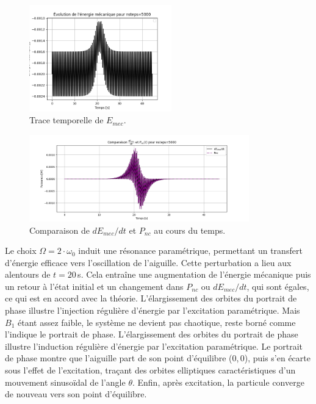 \documentclass[a4paper,12pt,twoside]{article}
\begin{document}
\begin{figure}[H]
    \centering
    \includegraphics[width=0.55\textwidth]{graphes/question_2_E_mec_manquant.png}
    \captionsetup{justification=centering}
    \caption{Trace temporelle de $E_{mec}$.}
    \label{fig4}
\end{figure}

\begin{figure}[H]
    \centering
    \includegraphics[width=0.85\textwidth]{graphes/question_2_E_mec.png}
    \captionsetup{justification=centering}
    \caption{Comparaison de $dE_{mec}/dt$ et $P_{nc}$ au cours du temps.}
    \label{fig5}
\end{figure}

Le choix $\Omega = 2 \cdot \omega_0$ induit une résonance paramétrique, permettant un transfert d’énergie efficace vers l’oscillation de l’aiguille. Cette perturbation a lieu aux alentours de $t=20$\,s. Cela entraîne une augmentation de l’énergie mécanique puis un retour à l'état initial et un changement dans $P_{nc}$ ou $dE_{mec}/dt$, qui sont égales, ce qui est en accord avec la théorie. L'élargissement des orbites du portrait de phase illustre l’injection régulière d’énergie par l’excitation paramétrique. Mais $B_1$ étant assez faible, le système ne devient pas chaotique, reste borné comme l'indique le portrait de phase. L'élargissement des orbites du portrait de phase illustre l’induction régulière d’énergie par l’excitation paramétrique. Le portrait de phase montre que l’aiguille part de son point d’équilibre (0,\,0), puis s’en écarte sous l’effet de l’excitation, traçant des orbites elliptiques caractéristiques d’un mouvement sinusoïdal de l’angle $\theta$. Enfin, après excitation, la particule converge de nouveau vers son point d’équilibre.
\end{document}
